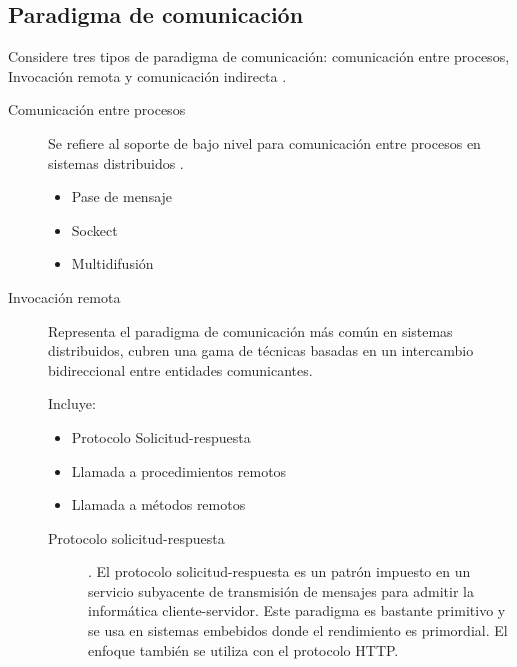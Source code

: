 \subsection{Paradigma de comunicación }
\label{subsec:paradigmas} 

Considere tres tipos de paradigma de comunicación: comunicación entre procesos, Invocación remota y comunicación indirecta     .

\begin{description}
	\item[Comunicación entre procesos] Se refiere al soporte de bajo nivel  para comunicación entre procesos en sistemas distribuidos .  
	  
	
		\begin{kaobox}[frametitle=Comunicación entre procesos ]
			
			\begin{itemize}
			\item Pase de mensaje
			\item Sockect
			\item Multidifusi\'on
		\end{itemize} 		\end{kaobox}   
	
		
	\item[Invocación remota] Representa el paradigma de comunicación más común en sistemas distribuidos, cubren una gama de técnicas basadas en un intercambio bidireccional entre entidades comunicantes. 
	
		\begin{kaobox}[frametitle=Invocación remota]
			Incluye:
			\begin{itemize}
				\item Protocolo Solicitud-respuesta  	
				\item Llamada a procedimientos remotos  	
				\item Llamada a m\'etodos remotos
		\end{itemize}  	\end{kaobox}   	 

	\begin{description}
		
		\item[Protocolo solicitud-respuesta].   El \gls{protocolo solicitud-respuesta} es un patrón impuesto en un servicio subyacente de transmisión de mensajes para admitir la informática cliente-servidor.  Este paradigma es bastante primitivo y  se usa  en sistemas embebidos donde el rendimiento es primordial. El  enfoque también se utiliza con el protocolo HTTP. 
		

\end{description}
\end{description}
